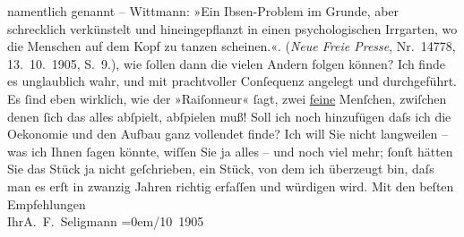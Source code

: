 \begin{ledgroupsized}[t]{13cm}
{{{                        namentlich genannt – Wittmann:
                            »Ein Ibsen-Problem im Grunde,
                            aber schrecklich verkünstelt und hineingepflanzt in einen
                            psychologischen Irrgarten, wo die Menschen auf dem Kopf zu tanzen
                            scheinen.«. (\emph{Neue Freie
                                Presse}, Nr. 14778, 13. 10. 1905,
                            S. 9.)}}}\label{K_L01563_1h}, wie ſollen dann die vielen Andern folgen
                    können? Ich finde es unglaublich wahr, und mit prachtvoller Conſequenz angelegt
                    und durchgeführt. Es ſind eben wirklich, wie der »Raiſonneur« ſagt, zwei \uline{feine} Menſchen, zwiſchen denen ſich das alles
                    abſpielt, abſpielen muß! Soll ich noch hinzufügen daſs ich die Oekonomie und den
                    Aufbau ganz vollendet finde? Ich will Sie nicht langweilen – was ich Ihnen ſagen
                    könnte, wiſſen Sie {\pb}ja alles – und noch viel mehr; ſonſt hätten Sie
                    das Stück ja nicht
                    geſchrieben, ein Stück, von
                    dem ich überzeugt bin, daſs man es erſt in zwanzig Jahren richtig erfaſſen und
                    würdigen wird.\pend
           \pstart
           Mit den beſten Empfehlungen{\\[\baselineskip]}Ihr\spacefill\mbox{A. F. Seligmann}\pend
           \leftskip=0em{}/10 1905\pend
           \endnumbering{}\end{ledgroupsized}  \newcommand{\dateiname}{L01563}\newcommand{\titel}{Adalbert Seligmann an Arthur Schnitzler, 13. 10. 1905}\newcommand{\editorInnen}{Martin Anton Müller und Gerd-Hermann Susen}
      